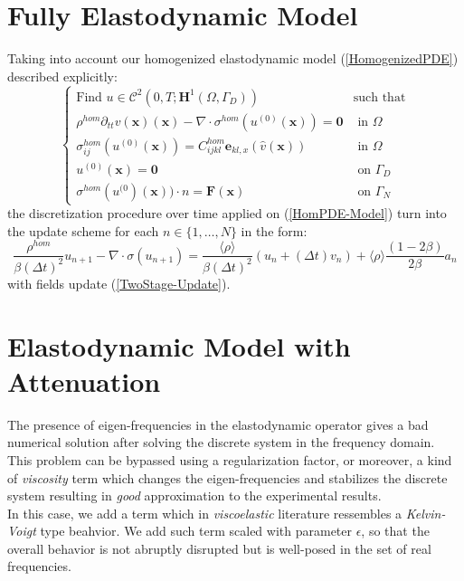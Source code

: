 \section{Fully Elastodynamic Model}
Taking into account our homogenized elastodynamic model (\ref{HomogenizedPDE}) described explicitly:
\begin{equation}
    \label{HomPDE-Model}
    \left \{
    \begin{array}{cc}
        \text{Find $u \in \mathcal{C}^2(0,T;\mathbf{H}^1(\Omega, \Gamma_D))$} & \text{such that} \\
        \rho^{hom} \partial_{tt} v(\mathbf{x}) (\mathbf{x}) - \nabla \cdot \sigma^{hom} (u^{(0)}(\mathbf{x}) ) = \mathbf{0} & \text{ in } \Omega \\
        \sigma^{hom}_{ij}(u^{(0)}(\mathbf{x})) = C^{hom}_{ijkl}\mathbf{e}_{kl,x}(\hat{v}(\mathbf{x})) & \text{ in } \Omega \\
        u^{(0)}(\mathbf{x}) = \mathbf{0} & \text{ on } \Gamma_D \\
        \sigma^{hom}(u^{(0})(\mathbf{x})) \cdot n = \mathbf{F}(\mathbf{x}) & \text{ on } \Gamma_N
    \end{array}
    \right .
\end{equation}
the discretization procedure over time applied on (\ref{HomPDE-Model}) turn into the update scheme for each $n \in \{1,\dots, N\}$ in the form:
\begin{equation*}
    \frac{\rho^{hom}}{\beta (\Delta t)^2} u_{n+1} - \nabla \cdot \sigma(u_{n+1}) = \frac{\langle\rho\rangle}{\beta (\Delta t)^2} ( u_{n} + (\Delta t) v_n ) + \langle\rho\rangle\frac{(1-2\beta)}{2\beta} a_n
\end{equation*}
with fields update (\ref{TwoStage-Update}).

\section{Elastodynamic Model with Attenuation}
The presence of eigen-frequencies in the elastodynamic operator gives a bad numerical solution after solving the discrete system in the frequency domain. This problem can be bypassed using a regularization factor, or moreover, a kind of \textit{viscosity} term which changes the eigen-frequencies and stabilizes the discrete system resulting in \textit{good} approximation to the experimental results.\\
In this case, we add a term which in \textit{viscoelastic} literature ressembles a \textit{Kelvin-Voigt} type beahvior. We add such term scaled with parameter $\epsilon$, so that the overall behavior is not abruptly disrupted but is well-posed in the set of real frequencies.

